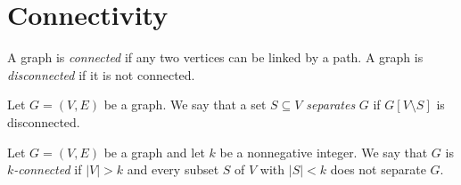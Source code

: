 \section{Connectivity}
\begin{definition}
  A graph is \emph{connected} if any two vertices can be linked by a path.
  A graph is \emph{disconnected} if it is not connected.
\end{definition}

\begin{definition}
  Let $G = (V, E)$ be a graph.
  We say that a set $S \subseteq V$ \emph{separates} $G$ if $G[V \setminus S]$
  is disconnected.
\end{definition}

\begin{definition}
  Let $G = (V, E)$ be a graph and let $k$ be a nonnegative integer.
  We say that $G$ is \emph{$k$-connected} if $|V| > k$ and every subset
  $S$ of $V$ with $|S| < k$ does not separate $G$.
\end{definition}